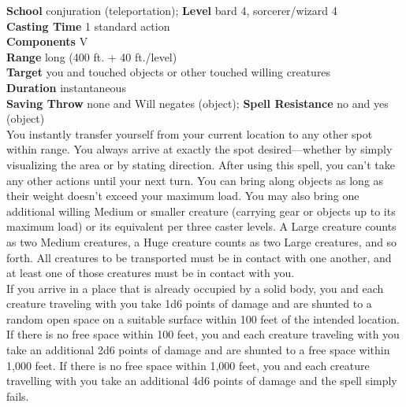 \textbf{School} conjuration (teleportation); \textbf{Level} bard 4, sorcerer/wizard 4\\
\textbf{Casting Time} 1 standard action\\
\textbf{Components} V\\
\textbf{Range} long (400 ft. + 40 ft./level)\\
\textbf{Target} you and touched objects or other touched willing creatures\\
\textbf{Duration} instantaneous\\
\textbf{Saving Throw} none and Will negates (object); \textbf{Spell Resistance} no and yes (object)\\
You instantly transfer yourself from your current location to any other spot within range. You always arrive at exactly the spot desired---whether by simply visualizing the area or by stating direction. After using this spell, you can't take any other actions until your next turn. You can bring along objects as long as their weight doesn't exceed your maximum load. You may also bring one additional willing Medium or smaller creature (carrying gear or objects up to its maximum load) or its equivalent per three caster levels. A Large creature counts as two Medium creatures, a Huge creature counts as two Large creatures, and so forth. All creatures to be transported must be in contact with one another, and at least one of those creatures must be in contact with you.\\
If you arrive in a place that is already occupied by a solid body, you and each creature traveling with you take 1d6 points of damage and are shunted to a random open space on a suitable surface within 100 feet of the intended location.\\
If there is no free space within 100 feet, you and each creature traveling with you take an additional 2d6 points of damage and are shunted to a free space within 1,000 feet. If there is no free space within 1,000 feet, you and each creature travelling with you take an additional 4d6 points of damage and the spell simply fails.\\
